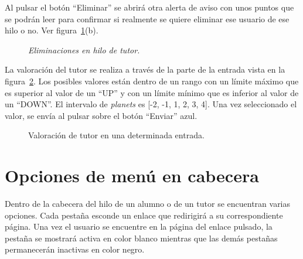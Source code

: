 \documentclass[a4paper, 12pt]{book}
\begin{document}
Al pulsar el bot\'on ``Eliminar'' se abrir\'a otra alerta de aviso con unos puntos que se podr\'an leer para confirmar si realmente se quiere eliminar ese
usuario de ese hilo o no. Ver figura~\ref{figura:hiloprofesor1}(b).
\begin{figure}
  \centering
  \caption{\textit{Eliminaciones en hilo de tutor.}}
  \label{figura:hiloprofesor1}
\end{figure}

La valoraci\'on del tutor se realiza a trav\'es de la parte de la entrada vista en la figura~\ref{figura:hiloprofesor2}. Los posibles valores est\'an dentro
de un rango con un l\'imite m\'aximo que es superior al valor de un ``UP'' y con un l\'imite m\'inimo que es inferior al valor de un ``DOWN''. El intervalo de
\textit{planets} es [-2, -1, 1, 2, 3, 4]. Una vez seleccionado el valor, se env\'ia al pulsar sobre el bot\'on ``Enviar'' azul.
\begin{figure}[htbp] 
  \centering
  \caption{Valoraci\'on de tutor en una determinada entrada.}
  \label{figura:hiloprofesor2}
\end{figure}

\section{Opciones de men\'u en cabecera}
Dentro de la cabecera del hilo de un alumno o de un tutor se encuentran varias opciones. Cada pesta\~na esconde un enlace que redirigir\'a a su 
correspondiente p\'agina. Una vez el usuario se encuentre en la p\'agina del enlace pulsado, la pesta\~na se mostrar\'a activa en color blanco mientras que 
las dem\'as pesta\~nas permanecer\'an inactivas en color negro.
\end{document}
